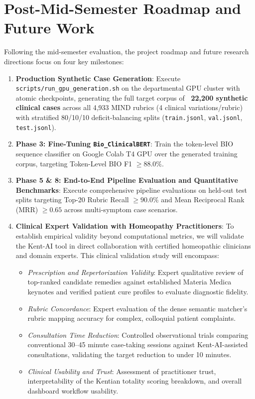 \begin{sloppypar}
\section{Post-Mid-Semester Roadmap and Future Work}
Following the mid-semester evaluation, the project roadmap and future research directions focus on four key milestones:
\begin{enumerate}
    \item \textbf{Production Synthetic Case Generation}: Execute \texttt{scripts/run\_gpu\_generation.sh} on the departmental GPU cluster with atomic checkpoints, generating the full target corpus of \textbf{~22,200 synthetic clinical cases} across all 4,933 MIND rubrics (4 clinical variations/rubric) with stratified 80/10/10 deficit-balancing splits (\texttt{train.jsonl}, \texttt{val.jsonl}, \texttt{test.jsonl}).
    \item \textbf{Phase 3: Fine-Tuning \texttt{Bio\_ClinicalBERT}}: Train the token-level BIO sequence classifier on Google Colab T4 GPU over the generated training corpus, targeting Token-Level BIO F1 $\ge 88.0\%$.
    \item \textbf{Phase 5 \& 8: End-to-End Pipeline Evaluation and Quantitative Benchmarks}: Execute comprehensive pipeline evaluations on held-out test splits targeting Top-20 Rubric Recall $\ge 90.0\%$ and Mean Reciprocal Rank (MRR) $\ge 0.65$ across multi-symptom case scenarios.
    \item \textbf{Clinical Expert Validation with Homeopathy Practitioners}: To establish empirical validity beyond computational metrics, we will validate the Kent-AI tool in direct collaboration with certified homeopathic clinicians and domain experts. This clinical validation study will encompass:
    \begin{itemize}
        \item \emph{Prescription and Repertorization Validity}: Expert qualitative review of top-ranked candidate remedies against established Materia Medica keynotes and verified patient cure profiles to evaluate diagnostic fidelity.
        \item \emph{Rubric Concordance}: Expert evaluation of the dense semantic matcher's rubric mapping accuracy for complex, colloquial patient complaints.
        \item \emph{Consultation Time Reduction}: Controlled observational trials comparing conventional 30--45 minute case-taking sessions against Kent-AI-assisted consultations, validating the target reduction to under 10 minutes.
        \item \emph{Clinical Usability and Trust}: Assessment of practitioner trust, interpretability of the Kentian totality scoring breakdown, and overall dashboard workflow usability.
    \end{itemize}
\end{enumerate}


\end{sloppypar}
